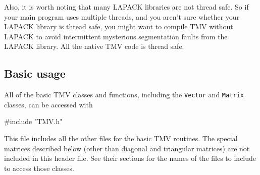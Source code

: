 \documentclass[twoside,letterpaper,11pt]{article}
\renewcommand{\tt}[1]{{\lstinline {#1}}}
\begin{document}
\begin{enumerate}
Also, it is worth noting that many LAPACK libraries are not thread safe.
So if your main program uses multiple threads, and you aren't sure whether
your LAPACK library is thread safe, you might want to compile TMV without 
LAPACK to avoid intermittent mysterious segmentation faults from the
LAPACK library.  All the native TMV code is thread safe.

\begin{comment}
\item
\textbf{Comments}

The code is highly commented, especially for the more complicated algorithms.
I have this egotistical quirk that I need to understand all of the code I write.
So none of the algorithms are just taken verbatim from LAPACK or anything like that.
I force myself to understand the algorithm (usually from Golub and van Loan,
but sometimes from a journal article or something I find on the net),
write a long comment explaining how it works, and then finally write the code
from scratch.  Then I usually compare my code to the LAPACK version, at which point
I have occasionally found ways to either speed it up or make it more accurate
(which also get commented, of course).

But the point is - if you want to understand how, say, the blocked Bunch-Kaufman
algorithm works, you'll probably do better looking at the comment in the 
TMV code than trying to decipher the LAPACK routines.  Plus, the code itself is
usually a lot more readable, since the arithmetic is written with the operator
overloads and such rather than the cryptic BLAS function names.
\end{comment}

\end{enumerate}

\subsection{Basic usage}

All of the basic TMV classes and functions, including the \tt{Vector} and \tt{Matrix} 
classes, can be accessed with
\begin{tmvcode}
#include "TMV.h"
\end{tmvcode}
This file includes all the other files for the basic TMV routines.  The 
special matrices described below (other than diagonal and triangular matrices) 
are not included in this header file.
See their sections for the names
of the files to include to access those classes.
\end{document}

